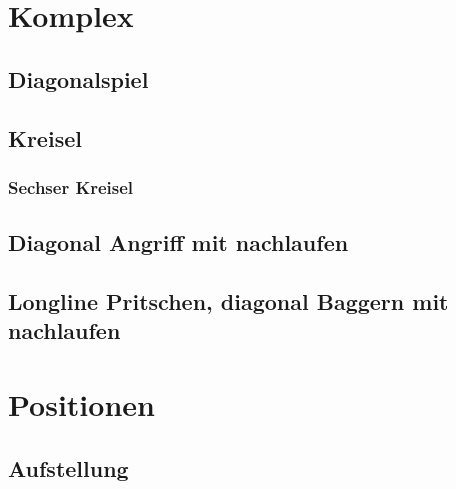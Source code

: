 \documentclass[]{book}
\begin{document}
\chapter{Komplex}\label{komplex}

\section{Diagonalspiel}\label{diagonalspiel}

\section{Kreisel}\label{kreisel}

\subsection{Sechser Kreisel}\label{sechser-kreisel}

\section{Diagonal Angriff mit
nachlaufen}\label{diagonal-angriff-mit-nachlaufen}

\section{Longline Pritschen, diagonal Baggern mit
nachlaufen}\label{longline-pritschen-diagonal-baggern-mit-nachlaufen}

\chapter{Positionen}\label{positionen}

\section{Aufstellung}\label{aufstellung}


\end{document}
